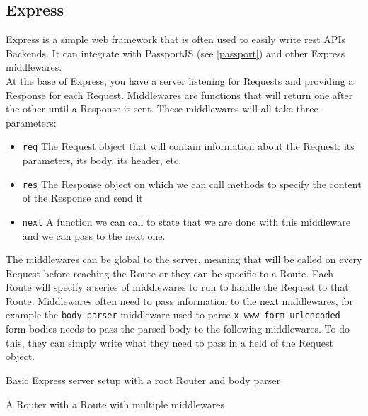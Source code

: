 \documentclass[twoside, openright,11pt,a4paper]{book}
\newenvironment{code}{\captionsetup{type=listing}}{}
\begin{document}
\subsection{Express}
Express is a simple web framework that is often used to easily write \gls{rest} APIs Backends. It can integrate with PassportJS (see \ref{passport}) and other Express middlewares. \\

At the base of Express, you have a server listening for Requests and providing a Response for each Request. Middlewares\cite{express:doc:middlewares} are functions that will return one after the other until a Response is sent. These middlewares will all take three parameters:
\begin{itemize}
	\item \verb+req+ The Request object that will contain information about the Request: its parameters, its body, its header, etc.
	\item \verb+res+ The Response object on which we can call methods to specify the content of the Response and send it
	\item \verb+next+ A function we can call to state that we are done with this middleware and we can pass to the next one.
\end{itemize}
The middlewares can be global to the server, meaning that will be called on every Request before reaching the Route or they can be specific to a Route. Each Route will specify a series of middlewares to run to handle the Request to that Route. Middlewares often need to pass information to the next middlewares, for example the \verb+body parser+ middleware used to parse \verb+x-www-form-urlencoded+ form bodies needs to pass the parsed body to the following middlewares. To do this, they can simply write what they need to pass in a field of the Request object. \\

\begin{code}
	\caption{Basic Express server setup with a root Router and body parser}
	\label{express_server}
\end{code}

\begin{code}
	\caption{A Router with a Route with multiple middlewares}
	\label{route_example}
\end{code}
\end{document}
